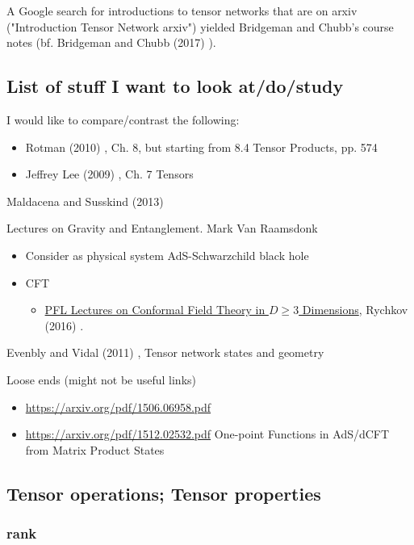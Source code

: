 \documentclass[10pt]{amsart}
\begin{document}
\begin{multicols*}{2}
A Google search for introductions to tensor networks that are on arxiv ("Introduction Tensor Network arxiv") yielded Bridgeman and Chubb's course notes (bf. Bridgeman and Chubb (2017) \cite{BrCh2017}).    

\subsection{List of stuff I want to look at/do/study}  
I would like to compare/contrast the following:  
\begin{itemize}
\item Rotman (2010) \cite{JRotman2010}, Ch. 8, but starting from 8.4 Tensor Products, pp. 574  
\item Jeffrey Lee (2009) \cite{JLee2009}, Ch. 7 Tensors 
\end{itemize}



Maldacena and Susskind (2013) \cite{MaSu2013}  

Lectures on Gravity and Entanglement.  Mark Van Raamsdonk  \cite{Raam2016}

\begin{itemize}
\item Consider as physical system AdS-Schwarzchild black hole   
\item CFT 
\begin{itemize}
\item \href{https://arxiv.org/pdf/1601.05000.pdf}{PFL Lectures on Conformal Field Theory in $D\geq 3$ Dimensions}, Rychkov (2016) \cite{Rych2016}.  
\end{itemize}
\end{itemize}

Evenbly and Vidal (2011) \cite{EvVi2011}, Tensor network states and geometry

Loose ends (might not be useful links)
\begin{itemize}
\item \url{https://arxiv.org/pdf/1506.06958.pdf}
\item \url{https://arxiv.org/pdf/1512.02532.pdf} One-point Functions in AdS/dCFT from Matrix Product States
\end{itemize}



\subsection{Tensor operations; Tensor properties}

\subsubsection{rank}


\end{multicols*}
\end{document}
